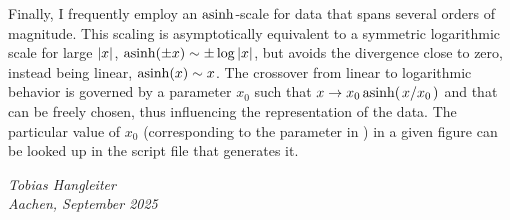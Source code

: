 Finally, I frequently employ an $\operatorname{asinh}$-scale for data that spans several orders of magnitude.
This scaling is asymptotically equivalent to a symmetric logarithmic scale for large $\abs{x}$, $\operatorname{asinh}(\pm x)\sim\pm\log\abs{x}$, but avoids the divergence close to zero, instead being linear, $\operatorname{asinh}(x)\sim x$.
The crossover from linear to logarithmic behavior is governed by a parameter $x_0$ such that $x\to x_0\asinh(\flatfrac{x}{x_0})$ and that can be freely chosen, thus influencing the representation of the data.
The particular value of $x_0$ (corresponding to the  parameter in \href{https://matplotlib.org/stable/gallery/scales/asinh_demo.html}{\matplotlib}) in a given figure can be looked up in the script file that generates it.

\begin{flushright}
    \itshape
    Tobias Hangleiter\\
    Aachen, September 2025
\end{flushright}
